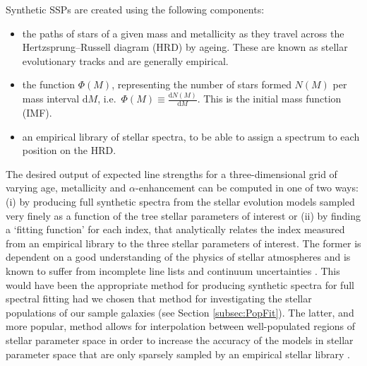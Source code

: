 			Synthetic SSPs are created using the following components:
			\begin{itemize}
				\item the paths of stars of a given mass and metallicity as they travel across the Hertzsprung--Russell diagram (HRD) by ageing. These are known as stellar evolutionary tracks and are generally empirical.
				\item the function $\Phi(M)$, representing the number of stars formed $N(M)$ per mass interval $\mathrm{d}M$, i.e.\ $\Phi(M) \equiv \frac{\mathrm{d}N(M)}{\mathrm{d}M}$. This is the initial mass function (IMF).
				\item an empirical library of stellar spectra, to be able to assign a spectrum to each position on the HRD. 
			\end{itemize}
			The desired output of expected line strengths for a three-dimensional grid of varying age, metallicity and $\alpha$-enhancement can be computed in one of two ways: (i) by producing full synthetic spectra from the stellar evolution models sampled very finely as a function of the tree stellar parameters of interest or (ii) by finding a `fitting function' for each index, that analytically relates the index measured from an empirical library to the three stellar parameters of interest. The former is dependent on a good understanding of the physics of stellar atmospheres and is known to suffer from incomplete line lists and continuum uncertainties \citep{Thomas2004}. This would have been the appropriate method for producing synthetic spectra for full spectral fitting had we chosen that method for investigating the stellar populations of our sample galaxies (see Section \ref{subsec:PopFit}). The latter, and more popular, method allows for interpolation between well-populated regions of stellar parameter space in order to increase the accuracy of the models in stellar parameter space that are only sparsely sampled by an empirical stellar library \citep{Thomas2010}. 

